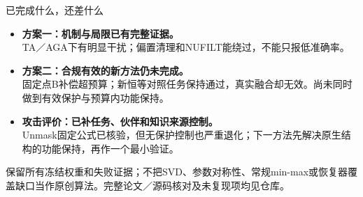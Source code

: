 \documentclass[aspectratio=169,11pt]{beamer}
\newcommand{\source}[1]{{\vfill\scriptsize\color{muted}#1\par}}
\begin{document}
\begin{frame}{已完成什么，还差什么}
\begin{itemize}\setlength{\itemsep}{10pt}
\item \textbf{方案一：机制与局限已有完整证据。}\\
TA／AGA下有明显干扰；偏置清理和NUFILT能绕过，不能只报低准确率。
\item \textbf{方案二：合规有效的新方法仍未完成。}\\
固定点B补偿超预算；新恒等对照任务保持通过，真实融合却无效。尚未同时做到有效保护与预算内功能保持。
\item \textbf{攻击评价：已补任务、伙伴和知识来源控制。}\\
Unmask固定公式已核验，但无保护控制也严重退化；下一方法先解决原生结构的功能保持，再作一个最小验证。
\end{itemize}
\source{保留所有冻结权重和失败证据；不把SVD、参数对称性、常规min-max或恢复器覆盖缺口当作原创算法。完整论文／源码核对及未复现项均见仓库。}
\end{frame}
\end{document}

